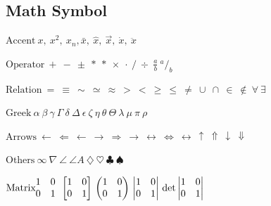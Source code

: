 \documentclass{article}
\begin{document}
    \subsection{Math Symbol}

    $\textrm{Accent} \: x, \: x^2, \: x_n,
    \bar{x}, \: \hat{x}, \: \vec{x}, \:
    \dot{x}, \: \ddot{x}$

    $\textrm{Operator} \: + \: - \: \pm
    \: * \: \ast \: \times \: \cdot \:
    / \: \div \: \frac{a}{b} \: ^a/_b$

    $\textrm{Relation} \: = \: \equiv \:
    \sim \: \simeq \: \approx \: > \: < \:
    \geq \: \leq \: \neq \: \cup \: \cap \: 
    \in \: \notin \: \forall \: \exists$

    $\textrm{Greek} \: \alpha \: \beta \:
    \gamma \: \Gamma \: \delta \: \Delta \:
    \epsilon \: \zeta \: \eta \: \theta \:
    \Theta \: \lambda \: \mu \: \pi \: \rho$

    $\textrm{Arrows} \: \leftarrow \: 
    \Leftarrow \: \longleftarrow \: \rightarrow
    \: \Rightarrow \: \longrightarrow \: 
    \leftrightarrow \: \Leftrightarrow \:
    \longleftrightarrow \: \uparrow \: \Uparrow
    \: \downarrow \: \Downarrow$

    $\textrm{Others} \: \infty \: \nabla
    \: \angle \: \angle{A} \: \diamondsuit
    \: \heartsuit \: \clubsuit \:
    \spadesuit$

    $\textrm{Matrix} \\ \\
        \begin{matrix}
            1 & 0\\
            0 & 1
        \end{matrix}
        \\
        \begin{bmatrix}
            1 & 0\\
            0 & 1
        \end{bmatrix}
        \\
        \begin{pmatrix}
            1 & 0\\
            0 & 1
        \end{pmatrix}
        \\
        \begin{vmatrix}
            1 & 0\\
            0 & 1
        \end{vmatrix}
        \\
        \det{
            \begin{vmatrix}
                1 & 0\\
                0 & 1
            \end{vmatrix}
        }
    $
\end{document}
